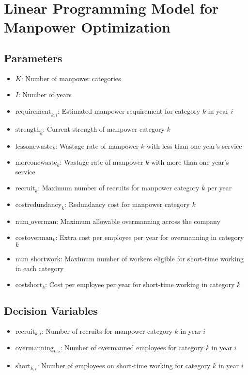 \documentclass{article}
\begin{document}
\section*{Linear Programming Model for Manpower Optimization}

\subsection*{Parameters}
\begin{itemize}
    \item \( K \): Number of manpower categories
    \item \( I \): Number of years
    \item \( \text{requirement}_{k,i} \): Estimated manpower requirement for category \( k \) in year \( i \)
    \item \( \text{strength}_{k} \): Current strength of manpower category \( k \)
    \item \( \text{lessonewaste}_{k} \): Wastage rate of manpower \( k \) with less than one year's service
    \item \( \text{moreonewaste}_{k} \): Wastage rate of manpower \( k \) with more than one year's service
    \item \( \text{recruit}_{k} \): Maximum number of recruits for manpower category \( k \) per year
    \item \( \text{costredundancy}_{k} \): Redundancy cost for manpower category \( k \)
    \item \( \text{num\_overman} \): Maximum allowable overmanning across the company
    \item \( \text{costoverman}_{k} \): Extra cost per employee per year for overmanning in category \( k \)
    \item \( \text{num\_shortwork} \): Maximum number of workers eligible for short-time working in each category
    \item \( \text{costshort}_{k} \): Cost per employee per year for short-time working in category \( k \)
\end{itemize}

\subsection*{Decision Variables}
\begin{itemize}
    \item \( \text{recruit}_{k,i} \): Number of recruits for manpower category \( k \) in year \( i \)
    \item \( \text{overmanning}_{k,i} \): Number of overmanned employees for category \( k \) in year \( i \)
    \item \( \text{short}_{k,i} \): Number of employees on short-time working for category \( k \) in year \( i \)
\end{itemize}
\end{document}
